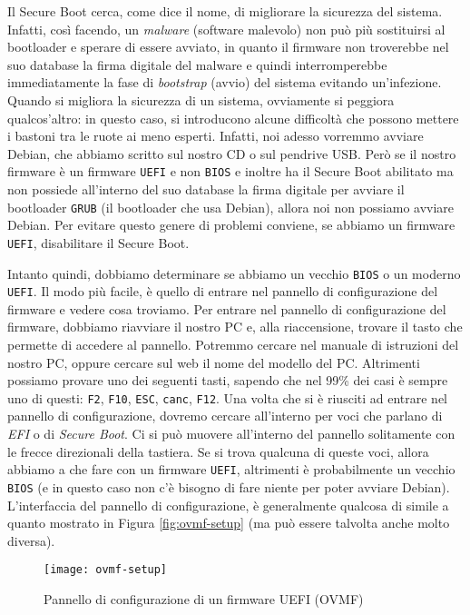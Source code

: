Il Secure Boot cerca, come dice il nome, di migliorare la sicurezza del sistema. Infatti, così facendo, un \textit{malware} (software malevolo) non può più sostituirsi al bootloader e sperare di essere avviato, in quanto il firmware non troverebbe nel suo database la firma digitale del malware e quindi interromperebbe immediatamente la fase di \textit{bootstrap} (avvio) del sistema evitando un'infezione. Quando si migliora la sicurezza di un sistema, ovviamente si peggiora qualcos'altro: in questo caso, si introducono alcune difficoltà che possono mettere i bastoni tra le ruote ai meno esperti. Infatti, noi adesso vorremmo avviare Debian, che abbiamo scritto sul nostro CD o sul pendrive USB. Però se il nostro firmware è un firmware \texttt{UEFI} e non \texttt{BIOS} e inoltre ha il Secure Boot abilitato ma non possiede all'interno del suo database la firma digitale per avviare il bootloader \texttt{GRUB} (il bootloader che usa Debian), allora noi non possiamo avviare Debian. Per evitare questo genere di problemi conviene, se abbiamo un firmware \texttt{UEFI}, disabilitare il Secure Boot.

Intanto quindi, dobbiamo determinare se abbiamo un vecchio \texttt{BIOS} o un moderno \texttt{UEFI}. Il modo più facile, è quello di entrare nel pannello di configurazione del firmware e vedere cosa troviamo. Per entrare nel pannello di configurazione del firmware, dobbiamo riavviare il nostro PC e, alla riaccensione, trovare il tasto che permette di accedere al pannello. Potremmo cercare nel manuale di istruzioni del nostro PC, oppure cercare sul web il nome del modello del PC. Altrimenti possiamo provare uno dei seguenti tasti, sapendo che nel 99\% dei casi è sempre uno di questi: \texttt{F2}, \texttt{F10}, \texttt{ESC}, \texttt{canc}, \texttt{F12}. Una volta che si è riusciti ad entrare nel pannello di configurazione, dovremo cercare all'interno per voci che parlano di \textit{EFI} o di \textit{Secure Boot}. Ci si può muovere all'interno del pannello solitamente con le frecce direzionali della tastiera. Se si trova qualcuna di queste voci, allora abbiamo a che fare con un firmware \texttt{UEFI}, altrimenti è probabilmente un vecchio \texttt{BIOS} (e in questo caso non c'è bisogno di fare niente per poter avviare Debian). L'interfaccia del pannello di configurazione, è generalmente qualcosa di simile a quanto mostrato in Figura \vref{fig:ovmf-setup} (ma può essere talvolta anche molto diversa).

\begin{figure}[ht]
	\centering
	\texttt{[image: ovmf-setup]}
	\caption{Pannello di configurazione di un firmware UEFI (OVMF)}
	\label{fig:ovmf-setup}
\end{figure}

